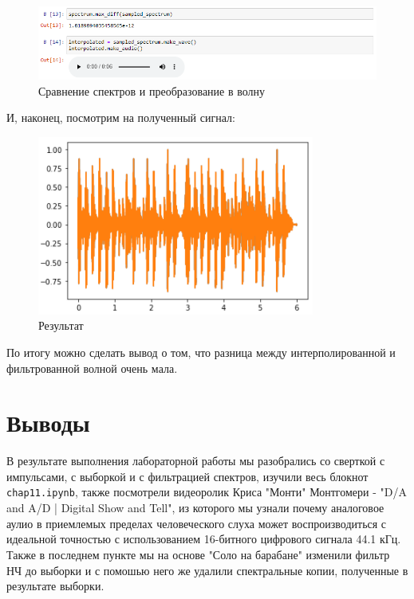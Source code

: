 \documentclass[a4paper]{article}
\begin{document}
            \begin{figure}[H]
                \centering
                \includegraphics[width=\textwidth]{ex_3_9.png}
                \caption{Сравнение спектров и преобразование в волну}
                \label{fig:ex_3_9}
            \end{figure}
            
            И, наконец, посмотрим на полученный сигнал:
            
            \begin{figure}[H]
                \centering
                \includegraphics{ex_3_10.png}
                \caption{Результат}
                \label{fig:ex_3_10}
            \end{figure}
            
            По итогу можно сделать вывод о том, что разница между интерполированной и фильтрованной волной очень мала.
            
    \newpage
        \section{Выводы}
             В результате выполнения лабораторной работы мы разобрались со сверткой с импульсами, с выборкой и с фильтрацией спектров, изучили весь блокнот \texttt{chap11.ipynb}, также посмотрели видеоролик Криса "Монти" Монтгомери - "D/A and A/D | Digital Show and Tell", из которого мы узнали почему аналоговое аулио в приемлемых пределах человеческого слуха может воспроизводиться с идеальной точностью с использованием 16-битного цифрового сигнала 44.1 кГц. Также в последнем пункте мы на основе "Соло на барабане"  изменили фильтр НЧ до выборки и с помошью него же удалили спектральные копии, полученные в результате выборки.
             
\end{document}

